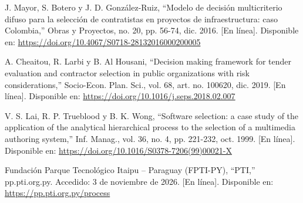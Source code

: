 \documentclass[12pt,a4paper]{article}
\newenvironment{reflist}{%
  \small\sloppy
  \begin{list}{}{%
    \setlength{\leftmargin}{1cm}%
    \setlength{\itemindent}{-1cm}%
    \setlength{\itemsep}{8pt}%
    \setlength{\parsep}{0pt}%
    \setlength{\listparindent}{0pt}%
  }%
}{\end{list}}
\begin{document}
\begin{reflist}
\item[] [39] J. Mayor, S. Botero y J. D. González-Ruiz, ``Modelo de decisión multicriterio difuso para la selección de contratistas en proyectos de infraestructura: caso Colombia,'' Obras y Proyectos, no. 20, pp. 56-74, dic. 2016. [En línea]. Disponible en: \url{https://doi.org/10.4067/S0718-28132016000200005}

\item[] [40] A. Cheaitou, R. Larbi y B. Al Housani, ``Decision making framework for tender evaluation and contractor selection in public organizations with risk considerations,'' Socio-Econ. Plan. Sci., vol. 68, art. no. 100620, dic. 2019. [En línea]. Disponible en: \url{https://doi.org/10.1016/j.seps.2018.02.007}

\item[] [41] V. S. Lai, R. P. Trueblood y B. K. Wong, ``Software selection: a case study of the application of the analytical hierarchical process to the selection of a multimedia authoring system,'' Inf. Manag., vol. 36, no. 4, pp. 221-232, oct. 1999. [En línea]. Disponible en: \url{https://doi.org/10.1016/S0378-7206(99)00021-X}


\item[] [42] Fundación Parque Tecnológico Itaipu – Paraguay (FPTI-PY), ``PTI,'' pp.pti.org.py. Accedido: 3 de noviembre de 2026. [En línea]. Disponible en: \url{https://pp.pti.org.py/process}


\end{reflist}
\end{document}
